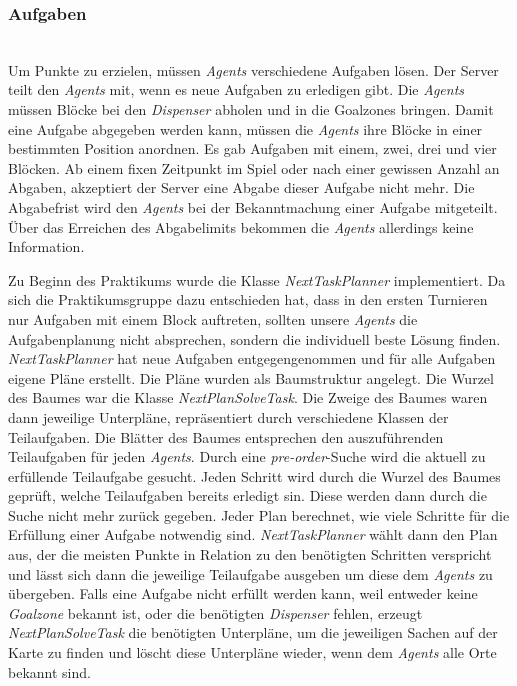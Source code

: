 \subsubsection{Aufgaben} ~\\
Um Punkte zu erzielen, müssen \textit{Agents} verschiedene Aufgaben lösen. Der Server teilt den \textit{Agents} mit, wenn es neue Aufgaben zu erledigen gibt. Die \textit{Agents} müssen Blöcke bei den \textit{Dispenser} abholen und in die Goalzones bringen. Damit eine Aufgabe abgegeben werden kann, müssen die \textit{Agents} ihre Blöcke in einer bestimmten Position anordnen. Es gab Aufgaben mit einem, zwei, drei und vier Blöcken. Ab einem fixen Zeitpunkt im Spiel oder nach einer gewissen Anzahl an Abgaben, akzeptiert der Server eine Abgabe dieser Aufgabe nicht mehr. Die Abgabefrist wird den \textit{Agents} bei der Bekanntmachung einer Aufgabe mitgeteilt. Über das Erreichen des Abgabelimits bekommen die \textit{Agents} allerdings keine Information.\newline

Zu Beginn des Praktikums wurde die Klasse \textit{NextTaskPlanner} implementiert. Da sich die Praktikumsgruppe dazu entschieden hat, dass in den ersten Turnieren nur Aufgaben mit einem Block auftreten, sollten unsere \textit{Agents} die Aufgabenplanung nicht absprechen, sondern die individuell beste Lösung finden. \textit{NextTaskPlanner} hat neue Aufgaben entgegengenommen und für alle Aufgaben eigene Pläne erstellt.
Die Pläne wurden als Baumstruktur angelegt. Die Wurzel des Baumes war die Klasse \textit{NextPlanSolveTask}. Die Zweige des Baumes waren dann jeweilige Unterpläne, repräsentiert durch verschiedene Klassen der Teilaufgaben. Die Blätter des Baumes entsprechen den auszuführenden Teilaufgaben für jeden \textit{Agents}. 
Durch eine \textit{pre-order}-Suche wird die aktuell zu erfüllende Teilaufgabe gesucht. Jeden Schritt wird durch die Wurzel des Baumes geprüft, welche Teilaufgaben bereits erledigt sin. Diese werden dann durch die Suche nicht mehr zurück gegeben.
Jeder Plan berechnet, wie viele Schritte für die Erfüllung einer Aufgabe notwendig sind. \textit{NextTaskPlanner} wählt dann den Plan aus, der die meisten Punkte in Relation zu den benötigten Schritten verspricht und lässt sich dann die jeweilige Teilaufgabe ausgeben um diese dem \textit{Agents} zu übergeben.
Falls eine Aufgabe nicht erfüllt werden kann, weil entweder keine \textit{Goalzone} bekannt ist, oder die benötigten \textit{Dispenser} fehlen, erzeugt \textit{NextPlanSolveTask} die benötigten Unterpläne, um die jeweiligen Sachen auf der Karte zu finden und löscht diese Unterpläne wieder, wenn dem \textit{Agents} alle Orte bekannt sind. \newline

